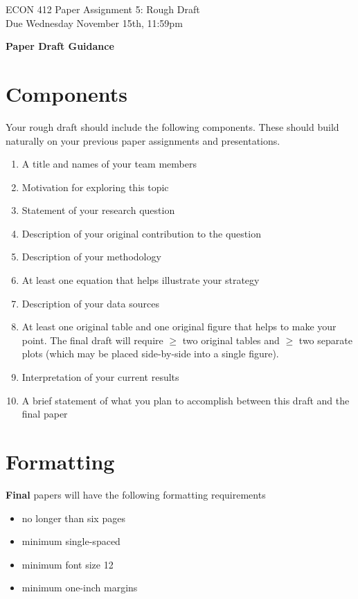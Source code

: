  \noindent
\begin{minipage}[t]{.8\textwidth}
\raggedright
	\Large ECON 412 Paper Assignment 5: Rough Draft \\
 	Due Wednesday November 15th, 11:59pm \\[1.5em] %
\end{minipage}%

\noindent

\textbf{\Large{Paper Draft Guidance}}


\section{Components}
Your rough draft should include the following components. These should build naturally on your previous paper assignments and presentations.

\begin{enumerate}
    \item A title and names of your team members
    \item Motivation for exploring this topic
    \item Statement of your research question
    \item Description of your original contribution to the question
    \item Description of your methodology
    \item At least one equation that helps illustrate your strategy
    \item Description of your data sources
    \item At least one original table and one original figure that helps to make your point. The final draft will require $\geq$ two original tables and $\geq $ two separate plots (which may be placed side-by-side into a single figure).
    \item Interpretation of your current results
    \item A brief statement of what you plan to accomplish between this draft and the final paper
\end{enumerate}

\section{Formatting}

\textbf{Final} papers will have the following formatting requirements
\begin{itemize}
    \item no longer than six pages
    \item minimum single-spaced
    \item minimum font size 12
    \item minimum one-inch margins
\end{itemize}

